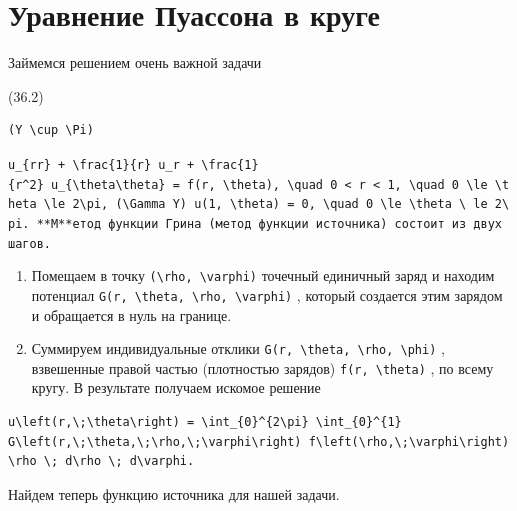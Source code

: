 \documentclass[
  ukrainian,
]{article}
\begin{document}
\section{Уравнение Пуассона в
круге}\label{ux443ux440ux430ux432ux43dux435ux43dux438ux435-ux43fux443ux430ux441ux441ux43eux43dux430-ux432-ux43aux440ux443ux433ux435}

Займемся решением очень важной задачи

(36.2)

\begin{verbatim}
(Y \cup \Pi)
\end{verbatim}

\texttt{\textquotesingle{}u\_\{rr\}\ +\ \textbackslash{}frac\{1\}\{r\}\ u\_r\ +\ \textbackslash{}frac\{1\}\{r\^{}2\}\ u\_\{\textbackslash{}theta\textbackslash{}theta\}\ =\ f(r,\ \textbackslash{}theta),\ \textbackslash{}quad\ 0\ \textless{}\ r\ \textless{}\ 1,\ \textbackslash{}quad\ 0\ \textbackslash{}le\ \textbackslash{}theta\ \textbackslash{}le\ 2\textbackslash{}pi,\textquotesingle{}\ \textquotesingle{}(\textbackslash{}Gamma\ Y)\textquotesingle{}\ \textquotesingle{}u(1,\ \textbackslash{}theta)\ =\ 0,\ \textbackslash{}quad\ 0\ \textbackslash{}le\ \textbackslash{}theta\ \textbackslash{}\ le\ 2\textbackslash{}pi.\textquotesingle{}\ **М**етод\ функции\ Грина\ (метод\ функции\ источника)\ состоит\ из\ двух\ шагов.}

\begin{enumerate}
\def\labelenumi{\arabic{enumi}.}
\item
  Помещаем в точку
  \texttt{(\textbackslash{}rho,\ \textbackslash{}varphi)} точечный
  единичный заряд и находим потенциал
  \texttt{G(r,\ \textbackslash{}theta,\ \textbackslash{}rho,\ \textbackslash{}varphi)}
  , который создается этим зарядом и обращается в нуль на границе.
\item
  Суммируем индивидуальные отклики
  \texttt{G(r,\ \textbackslash{}theta,\ \textbackslash{}rho,\ \textbackslash{}phi)}
  , взвешенные правой частью (плотностью зарядов)
  \texttt{f(r,\ \textbackslash{}theta)} , по всему кругу. В результате
  получаем искомое решение
\end{enumerate}

\begin{verbatim}
u\left(r,\;\theta\right) = \int_{0}^{2\pi} \int_{0}^{1} G\left(r,\;\theta,\;\rho,\;\varphi\right) f\left(\rho,\;\varphi\right) \rho \; d\rho \; d\varphi.
\end{verbatim}

Найдем теперь функцию источника для нашей задачи.
\end{document}
